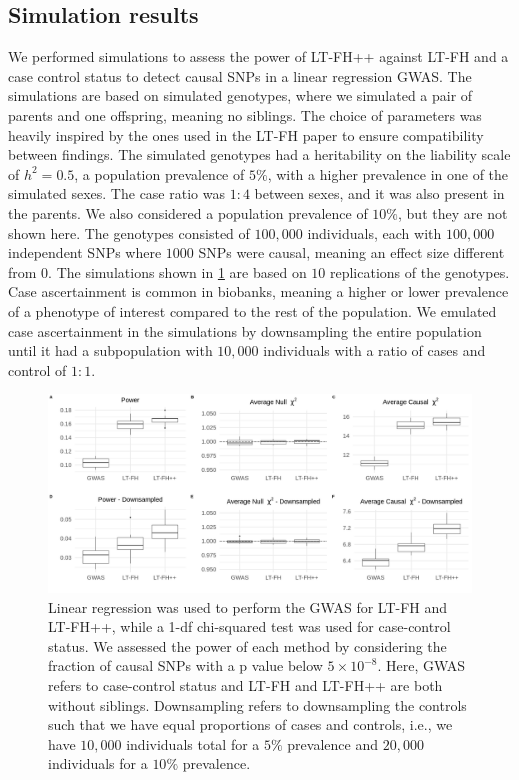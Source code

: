 \subsection{Simulation results}
We performed simulations to assess the power of LT-FH++ against LT-FH and a case control status to detect causal SNPs in a linear regression GWAS. The simulations are based on simulated genotypes, where we simulated a pair of parents and one offspring, meaning no siblings. The choice of parameters was heavily inspired by the ones used in the LT-FH paper to ensure compatibility between findings. The simulated genotypes had a heritability on the liability scale of $ h^2 = 0.5 $, a population prevalence of $ 5\% $, with a higher prevalence in one of the simulated sexes. The case ratio was $ 1:4 $ between sexes, and it was also present in the parents. We also considered a population prevalence of $ 10\% $, but they are not shown here. The genotypes consisted of $ 100,000 $ individuals, each with $ 100,000 $ independent SNPs where $ 1000 $ SNPs were causal, meaning an effect size different from $ 0 $. The simulations shown in \cref{fig:LTFHppSimulationResults} are based on $ 10 $ replications of the genotypes. Case ascertainment is common in biobanks, meaning a higher or lower prevalence of a phenotype of interest compared to the rest of the population. We emulated case ascertainment in the simulations by downsampling the entire population until it had a subpopulation with $ 10,000 $ individuals with a ratio of cases and control of $ 1:1 $.
\begin{figure}[h]
	\includegraphics[width=\textwidth]{results/boxplot_05prev_both.png}
	\caption[Simulation results for a $ 5\% $ prevalence, with and without downsampling of controls]{Linear regression was used to perform the GWAS for LT-FH and LT-FH++, while a 1-df chi-squared test was used for case-control status. We assessed the power of each method by considering the fraction of causal SNPs with a p value below $ 5 \times 10^{-8} $. Here, GWAS refers to case-control status and LT-FH and LT-FH++ are both without siblings. Downsampling refers to downsampling the controls such that we have equal proportions of cases and controls, i.e., we have $ 10,000 $ individuals total for a $ 5\% $ prevalence and $ 20,000 $ individuals for a $ 10\% $ prevalence.}
	\label{fig:LTFHppSimulationResults}
\end{figure}

